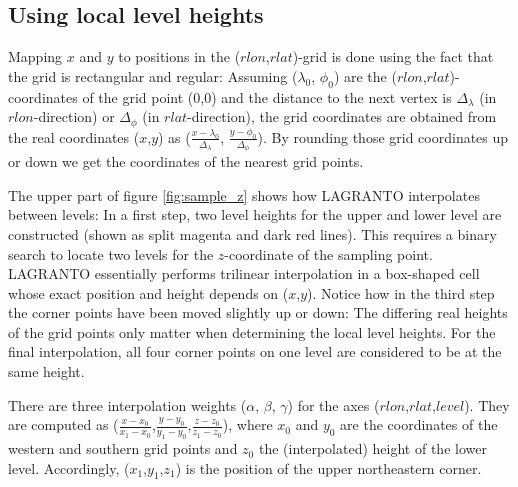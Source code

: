 \subsection{Using local level heights}
Mapping $x$ and $y$ to positions in the ($rlon$,$rlat$)-grid is done using the fact that the grid is rectangular and regular: Assuming ($\lambda_0$, $\phi_0$) are the ($rlon$,$rlat$)-coordinates of the grid point ($0$,$0$) and the distance to the next vertex is $\Delta_\lambda$ (in $rlon$-direction) or $\Delta_\phi$ (in $rlat$-direction), the grid coordinates are obtained from the real coordinates ($x$,$y$) as ($\frac{x - \lambda_0}{\Delta_\lambda}$, $\frac{y - \phi_0}{\Delta_\phi}$). By rounding those grid coordinates up or down we get the coordinates of the nearest grid points.

The upper part of figure \ref{fig:sample_z} shows how LAGRANTO interpolates between levels: In a first step, two level heights for the upper and lower level are constructed (shown as split magenta and dark red lines). This requires a binary search to locate two levels for the $z$-coordinate of the sampling point. LAGRANTO essentially performs trilinear interpolation in a box-shaped cell whose exact position and height depends on ($x$,$y$). Notice how in the third step the corner points have been moved slightly up or down: The differing real heights of the grid points only matter when determining the local level heights. For the final interpolation, all four corner points on one level are considered to be at the same height.

There are three interpolation weights ($\alpha$, $\beta$, $\gamma$) for the axes ($rlon$,$rlat$,$level$). They are computed as ($\frac{x-x_0}{x_1-x_0}$,$\frac{y-y_0}{y_1-y_0}$,$\frac{z-z_0}{z_1-z_0}$), where $x_0$ and $y_0$ are the coordinates of the western and southern grid points and $z_0$ the (interpolated) height of the lower level. Accordingly, ($x_1$,$y_1$,$z_1$) is the position of the upper northeastern corner.


